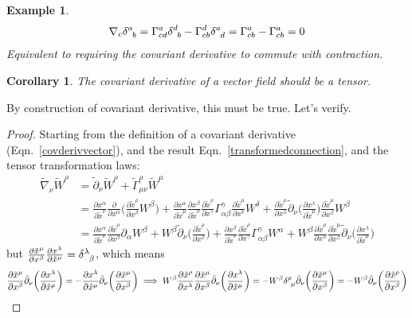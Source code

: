 \documentclass[a4paper]{article}
\newtheorem{eg}{Example}[section]
\theoremstyle{new}
\newtheorem{cor}{Corollary}[section]
\begin{document}
\begin{eg}
$$\nabla_c\tensor*{\delta}{*_{}^{a}_{b}}=\Gamma^a_{cd}\tensor*{\delta}{*_{}^{d}_{b}}-\Gamma^d_{cb}\tensor*{\delta}{*_{}^{a}_{d}}=\Gamma^a_{cb}-\Gamma^a_{cb}=0$$
Equivalent to requiring the covariant derivative to commute with contraction.
\end{eg}
\begin{cor}
The covariant derivative of a vector field should be a tensor.
\end{cor}
By construction of covariant derivative, this must be true. Let's verify.
\begin{proof}
Starting from the definition of a covariant derivative (Eqn.~\ref{covderivvector}), and the result Eqn.~\ref{transformedconnection}, and the tensor transformation laws:
\begin{align}
    \tilde{\nabla}_\nu\tilde{W}^\rho&=\tilde{\partial}_\nu\tilde{W}^\rho+\tilde{\Gamma}^\rho_{\mu\nu}\tilde{W}^\mu\nonumber\\&=\frac{\partial x^\alpha}{\partial\tilde{x}^\nu}\frac{\partial}{\partial x^\alpha}\bigg(\frac{\partial\tilde{x}^\rho}{\partial x^\beta}W^\beta\bigg)+\frac{\partial x^\alpha}{\partial\tilde{x}^\mu}\frac{\partial x^\beta}{\partial\tilde{x}^\nu}\frac{\partial\tilde{x}^\rho}{\partial x^\gamma}\Gamma^\gamma_{\alpha\beta}\frac{\partial\tilde{x}^\mu}{\partial x^\delta}W^\delta+\frac{\partial\tilde{x}^\rho}{\partial x^\lambda}\tilde{\partial}_\nu\bigg(\frac{\partial x^\lambda}{\partial\tilde{x}^\mu}\bigg)\frac{\partial\tilde{x}^\mu}{\partial x^\beta}W^\beta\nonumber\\&=\frac{\partial x^\alpha}{\partial\tilde{x}^\nu}\frac{\partial\tilde{x}^\rho}{\partial x^\beta}\partial_\alpha W^\beta+W^\beta\tilde{\partial}_\nu\bigg(\frac{\partial\tilde{x}^\rho}{\partial x^\beta}\bigg)+\frac{\partial x^\beta}{\partial\tilde{x}^\nu}\frac{\partial\tilde{x}^\rho}{\partial x^\gamma}\Gamma_{\alpha\beta}^\gamma W^\alpha+W^\beta\frac{\partial\tilde{x}^\rho}{\partial x^\lambda}\frac{\partial\tilde{x}^\mu}{\partial x^\beta}\tilde{\partial}_\nu\bigg(\frac{\partial x^\lambda}{\partial\tilde{x}^\mu}\bigg)\nonumber
\end{align}
but $\frac{\partial\tilde{x}^\mu}{\partial x^\beta}\frac{\partial x^\lambda}{\partial\tilde{x}^\mu}=\tensor*{\delta}{*_{}^{\lambda}_{\beta}}$, which means
$$\frac{\partial\tilde{x}^\mu}{\partial x^\beta}\tilde{\partial}_\nu\bigg(\frac{\partial x^\lambda}{\partial\tilde{x}^\mu}\bigg)=-\frac{\partial x^\lambda}{\partial\tilde{x}^\mu}\tilde{\partial}_\nu\bigg(\frac{\partial\tilde{x}^\mu}{\partial x^\beta}\bigg)\implies W^\beta\frac{\partial\tilde{x}^\rho}{\partial x^\lambda}\frac{\partial\tilde{x}^\mu}{\partial x^\beta}\tilde{\partial}_\nu\bigg(\frac{\partial x^\lambda}{\partial\tilde{x}^\mu}\bigg)=-W^\beta\tensor*{\delta}{*_{}^{\rho}_{\mu}}\tilde{\partial}_\nu\bigg(\frac{\partial\tilde{x}^\mu}{\partial x^\beta}\bigg)=-W^\beta\tilde{\partial}_\nu\bigg(\frac{\partial\tilde{x}^\rho}{\partial x^\beta}\bigg)$$

\end{proof}
\end{document}
